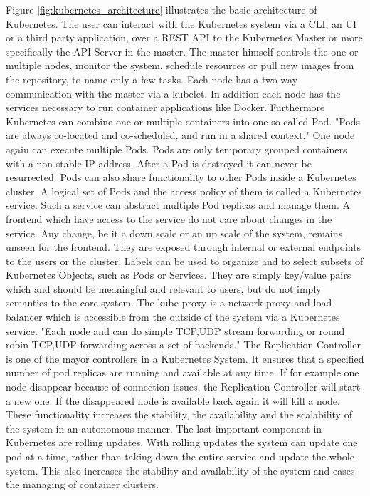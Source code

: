 Figure \ref{fig:kubernetes_architecture} illustrates the basic architecture of Kubernetes.
The user can interact with the Kubernetes system via a \ac{CLI}, an \ac{UI} or a third party application, over a \ac{REST} \ac{API} to the Kubernetes Master or more specifically the \ac{API} Server in the master.
The master himself controls the one or multiple nodes, monitor the system, schedule resources or pull new images from the repository, to name only a few tasks.
Each node has a two way communication with the master via a kubelet.
In addition each node has the services necessary to run container applications like Docker.
Furthermore Kubernetes can combine one or multiple containers into one so called Pod.\cite[cf.][p. 7]{Mulyana:2016}
"Pods are always co-located and co-scheduled, and run in a shared context."\cite{Kubernetes:pods:2016}
One node again can execute multiple Pods.
Pods are only temporary grouped containers with a non-stable IP address.
After a Pod is destroyed it can never be resurrected.
Pods can also share functionality to other Pods inside a Kubernetes cluster.
A logical set of Pods and the access policy of them is called a Kubernetes service.
Such a service can abstract multiple Pod replicas and manage them.
A frontend which have access to the service do not care about changes in the service.
Any change, be it a down scale or an up scale of the system, remains unseen for the frontend.
They are exposed through internal or external endpoints to the users or the cluster.\cite[cf.][p. 11]{MSV:2016}
Labels can be used to organize and to select subsets of Kubernetes Objects, such as Pods or Services.\cite[cf.]{Kubernetes:labels:2016}
They are simply key/value pairs which and should be meaningful and relevant to users, but do not imply semantics to the core system.\cite[cf.]{Kubernetes:labels:2016}
The kube-proxy is a network proxy and load balancer which is accessible from the outside of the system via a Kubernetes service.\cite[cf.][p. 7]{Mulyana:2016}
"Each node and can do simple TCP,UDP stream forwarding or round robin TCP,UDP forwarding across a set of backends."\cite{Kubernetes:kube-proxy:2016}
The Replication Controller is one of the mayor controllers in a Kubernetes System.
It ensures that a specified number of pod replicas are running and available at any time.\cite[cf.]{Kubernetes:replication-controller:2016}
If for example one node disappear because of connection issues, the Replication Controller will start a new one.
If the disappeared node is available back again it will kill a node.
These functionality increases the stability, the availability and the scalability of the system in an autonomous manner.
The last important component in Kubernetes are rolling updates.
With rolling updates the system can update one pod at a time, rather than taking down the entire service and update the whole system.\cite[cf.]{Kubernetes:rolling-updates:2016}
This also increases the stability and availability of the system and eases the managing of container clusters.

